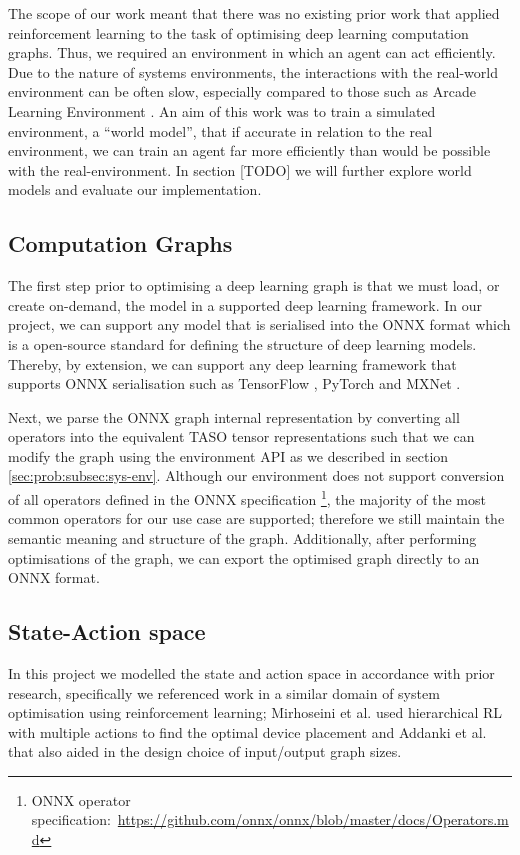 The scope of our work meant that there was no existing prior work that applied reinforcement learning to the task of optimising deep learning computation graphs. Thus, we required an environment in which an agent can act efficiently. Due to the nature of systems environments, the interactions with the real-world environment can be often slow, especially compared to those such as Arcade Learning Environment \cite{Bellemare_2013}. An aim of this work was to train a simulated environment, a ``world model'', that if accurate in relation to the real environment, we can train an agent far more efficiently than would be possible with the real-environment. In section [TODO] we will further explore world models and evaluate our implementation.

\subsection{Computation Graphs}
The first step prior to optimising a deep learning graph is that we must load, or create on-demand, the model in a supported deep learning framework. In our project, we can support any model that is serialised into the ONNX \cite{bai2019onnx} format which is a open-source standard for defining the structure of deep learning models. Thereby, by extension, we can support any deep learning framework that supports ONNX serialisation such as TensorFlow \cite{tensorflow2015-whitepaper}, PyTorch \cite{pytorch} and MXNet \cite{chen2015mxnet}.

Next, we parse the ONNX graph internal representation by converting all operators into the equivalent TASO tensor representations such that we can modify the graph using the environment API as we described in section \ref{sec:prob:subsec:sys-env}. Although our environment does not support conversion of all operators defined in the ONNX specification \footnote{ONNX operator specification:~\url{https://github.com/onnx/onnx/blob/master/docs/Operators.md}}, the majority of the most common operators for our use case are supported; therefore we still maintain the semantic meaning and structure of the graph. Additionally, after performing optimisations of the graph, we can export the optimised graph directly to an ONNX format.

\subsection{State-Action space}
\label{sec:prob:subsec:sap}
In this project we modelled the state and action space in accordance with prior research, specifically we referenced work in a similar domain of system optimisation using reinforcement learning; Mirhoseini et al. \cite{mirhoseini2018hierarchical} used hierarchical RL with multiple actions to find the optimal device placement and Addanki et al. \cite{addanki2019placeto} that also aided in the design choice of input/output graph sizes.

